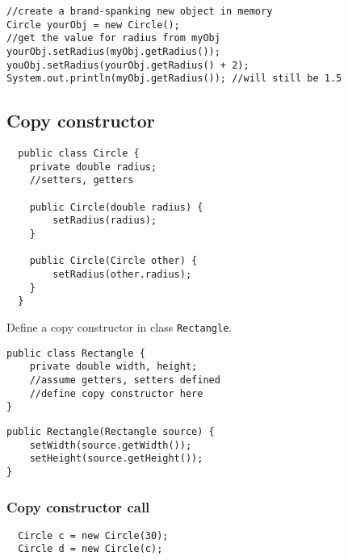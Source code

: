 \begin{answer} \begin{lstlisting}
//create a brand-spanking new object in memory
Circle yourObj = new Circle(); 
//get the value for radius from myObj
yourObj.setRadius(myObj.getRadius());
youObj.setRadius(yourObj.getRadius() + 2);
System.out.println(myObj.getRadius()); //will still be 1.5
\end{lstlisting} \end{answer}

\clearpage
\subsection{Copy constructor}
  \begin{lstlisting}
  public class Circle {
  	private double radius;
  	//setters, getters
 
  	public Circle(double radius) {
		setRadius(radius);
  	}
	
	public Circle(Circle other) {
		setRadius(other.radius);
  	}
  }
  \end{lstlisting}   
  
\begin{exercise}
Define a copy constructor in class \texttt{Rectangle}. 

\begin{lstlisting}[frame=single,style=buggy]
public class Rectangle {
	private double width, height;
	//assume getters, setters defined
	//define copy constructor here
}
\end{lstlisting}  	
\end{exercise} 
\begin{answer} \begin{lstlisting}
public Rectangle(Rectangle source) {
	setWidth(source.getWidth());
	setHeight(source.getHeight());
}
\end{lstlisting} \end{answer}

\subsubsection{Copy constructor call} 
  \begin{lstlisting}
  Circle c = new Circle(30);
  Circle d = new Circle(c);
  \end{lstlisting} 

